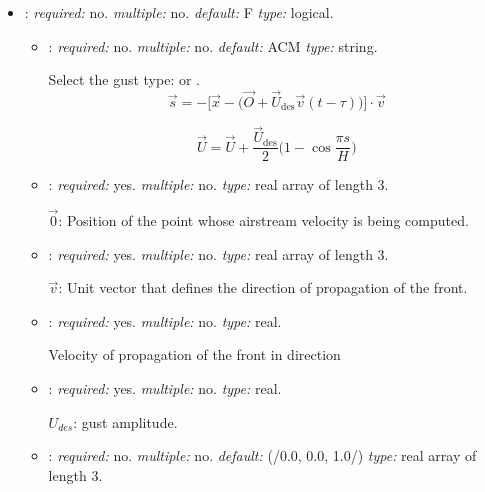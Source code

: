 \begin{itemize}
\item {}: \textit{required:} no. \textit{multiple:} no. 
\textit{default:} F \textit{type:} logical.

\begin{itemize}
    
    \item {}: \textit{required:} no. \textit{multiple:} no. \textit{default:} ACM \textit{type:} string.
    
    Select the gust type:  or .
    \begin{equation}
        \vec{s} = -\big[\vec{x} - \big(\vec{O} + \vec{U}_\mathrm{des}\vec{v}(t-\tau)\big)]\cdot\vec{v}
    \end{equation}
        
    \begin{equation}
        \vec{U} = \vec{U}  + \dfrac{\vec{U}_\mathrm{des}}{2}\bigg(1-\cos{\frac{\pi s}{H}}\bigg)    
    \end{equation}
    
    \item {}: \textit{required:} yes. \textit{multiple:} no. 
    \textit{type:} real array of length 3.
    
    $\vec{0}$: Position of the point  whose airstream velocity is being computed. 
    
    \item {}: \textit{required:} yes. \textit{multiple:} no. 
    \textit{type:} real array of length 3.
    
    $\vec{v}$: Unit vector that defines the direction of propagation of the front. 
    
    \item {}: \textit{required:} yes. \textit{multiple:} no. 
    \textit{type:} real.
    
    Velocity of propagation of the front in direction 
    
    \item {}: \textit{required:} yes. \textit{multiple:} no. 
    \textit{type:} real.
    
    $U_{des}$: gust amplitude. 
    
    \item {}: \textit{required:} no. 
    \textit{multiple:} no. \textit{default:} (/0.0, 0.0, 1.0/) 
    \textit{type:} real array of length 3.
    

\end{itemize}
\end{itemize}
